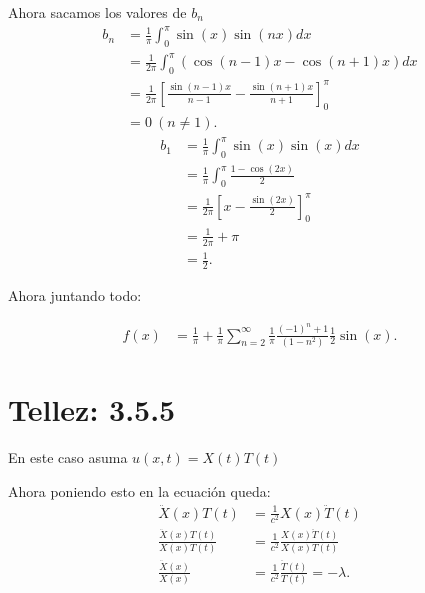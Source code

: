 \documentclass{report}
\begin{document}
Ahora sacamos los valores de $b_n$
\begin{align*}
  b_n &= \frac{1}{\pi}\int_{0}^{\pi}\sin\left( x \right) \sin\left( nx \right) dx \\
  &= \frac{1}{2\pi} \int_{0}^{\pi}\left( \cos\left( n - 1 \right) x - \cos\left( n + 1 \right) x \right) dx \\
  &= \frac{1}{2\pi}\left[ \frac{\sin\left( n - 1 \right) x}{n - 1} - \frac{\sin\left( n + 1 \right) x}{n + 1} \right]_{0}^{\pi} \\
  &= 0\ \left( n \neq 1 \right)
.\end{align*}
\begin{align*}
  b_1 &= \frac{1}{\pi}\int_{0}^{\pi}\sin\left( x \right) \sin\left( x \right) dx \\
  &= \frac{1}{\pi}\int_{0}^{\pi} \frac{1 - \cos\left( 2x \right) }{2} \\
  &= \frac{1}{2\pi}\left[ x - \frac{\sin\left( 2x \right) }{2} \right]_{0}^{\pi} \\
  &= \frac{1}{2\pi} + \pi \\
  &= \frac{1}{2}
.\end{align*}

Ahora juntando todo:

\begin{align*}
  f\left( x \right) &= \frac{1}{\pi} + \frac{1}{\pi}\sum_{n=2}^{\infty} \frac{1}{\pi}\frac{\left( -1 \right)^{n} + 1}{\left( 1 - n^2 \right) } \frac{1}{2} \sin\left( x \right)
.\end{align*}

\chapter{Tellez: 3.5.5}

En este caso asuma $u\left( x, t \right) = X\left( t \right)T\left( t \right)  $

Ahora poniendo esto en la ecuación queda:
\begin{align*}
  \ddot{X}\left( x \right) T\left( t \right) &= \frac{1}{c^2}X\left( x \right) \ddot{T}\left( t \right)  \\
  \frac{\ddot{X}\left( x \right) T\left( t \right)}{X\left( x \right) T\left( t \right) } &= \frac{1}{c^2} \frac{X\left( x \right) \ddot{T}\left( t \right) }{X\left( x \right) T\left( t \right) } \\
  \frac{\ddot{X}\left( x \right) }{X\left( x \right) } &= \frac{1}{c^2} \frac{\ddot{T}\left( t \right) }{T\left( t \right) } = -\lambda
.\end{align*}
\end{document}
